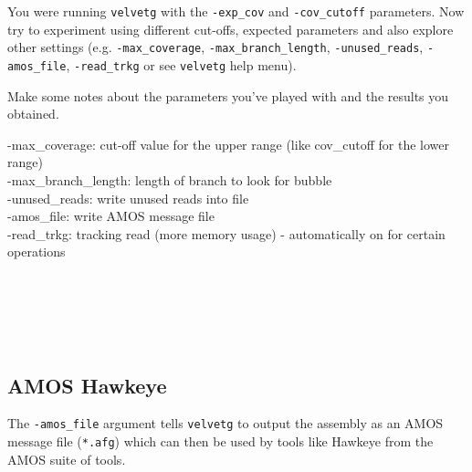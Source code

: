 \begin{steps}
You were running \texttt{velvetg} with the \texttt{-exp\_cov} and
\texttt{-cov\_cutoff} parameters. Now try to experiment using different
cut-offs, expected parameters and also explore other settings (e.g.
\texttt{-max\_coverage}, \texttt{-max\_branch\_length}, \texttt{-unused\_reads},
\texttt{-amos\_file}, \texttt{-read\_trkg} or see \texttt{velvetg} help menu).
\end{steps}

\begin{questions}
Make some notes about the parameters you've played with and the results you
obtained.
\begin{answer}
-max\_coverage: cut-off value for the upper range (like cov\_cutoff for the lower range)\\
-max\_branch\_length: length of branch to look for bubble\\
-unused\_reads: write unused reads into file\\
-amos\_file: write AMOS message file\\
-read\_trkg: tracking read (more memory usage) - automatically on for certain operations\\
\end{answer}
\\
\\
\\
\\
\end{questions}

\subsection{AMOS Hawkeye}

The \texttt{-amos\_file} argument tells \texttt{velvetg} to output the assembly
as an AMOS message file (\texttt{*.afg}) which can then be used by tools like
Hawkeye from the AMOS suite of tools.

